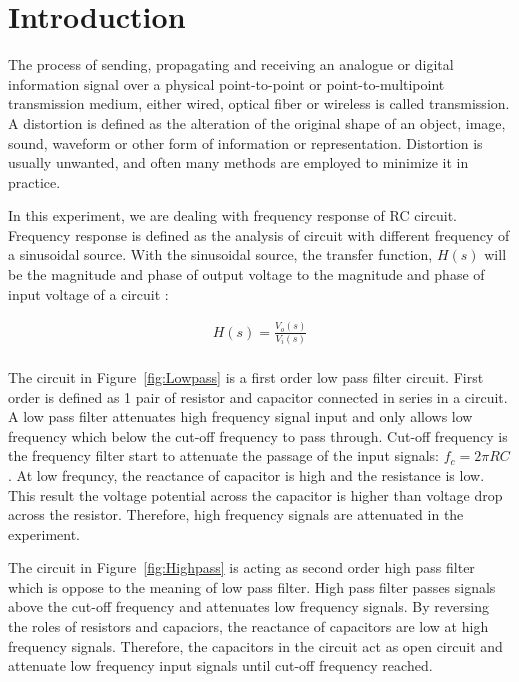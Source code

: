 \documentclass[a4paper, 12pt, english]{article}
\begin{document}
\section{Introduction}
The process of sending, propagating and receiving an analogue or digital information signal over a physical point-to-point or point-to-multipoint transmission medium, either wired, optical fiber or wireless is called transmission. A distortion is defined as the alteration of the original shape of an object, image, sound, waveform or other form of information or representation. Distortion is usually unwanted, and often many methods are employed to minimize it in practice. 
\newline

In this experiment, we are dealing with frequency response of RC circuit. Frequency response is defined as the analysis of circuit with different frequency of a sinusoidal source. With the sinusoidal source, the transfer function, $H(s)$ will be the magnitude and phase of output voltage to the magnitude and phase of input voltage of a circuit :

\begin{gather*}
H(s) = \frac{V_o(s)}{V_i(s)}\\
\end{gather*}

The circuit in Figure~\ref{fig:Lowpass} is a first order low pass filter circuit. First order is defined as 1 pair of resistor and capacitor connected in series in a circuit. A low pass filter attenuates high frequency signal input and only allows low frequency which below the cut-off frequency to pass through. Cut-off frequency is the frequency filter start to attenuate the passage of the input signals: $f_c = 2\pi RC$. At low frequncy, the reactance of capacitor is high and the resistance is low. This result the voltage potential across the capacitor is higher than voltage drop across the resistor. Therefore, high frequency signals are attenuated in the experiment.
\newline

The circuit in Figure~\ref{fig:Highpass}  is acting as second order high pass filter which is oppose to the meaning of low pass filter. High pass filter passes signals above the cut-off frequency and attenuates low frequency signals. By reversing the roles of resistors and capaciors, the reactance of capacitors are low at high frequency signals. Therefore, the capacitors in the circuit act as open circuit and attenuate low frequency input signals until cut-off frequency reached. 
\newline
\end{document}
